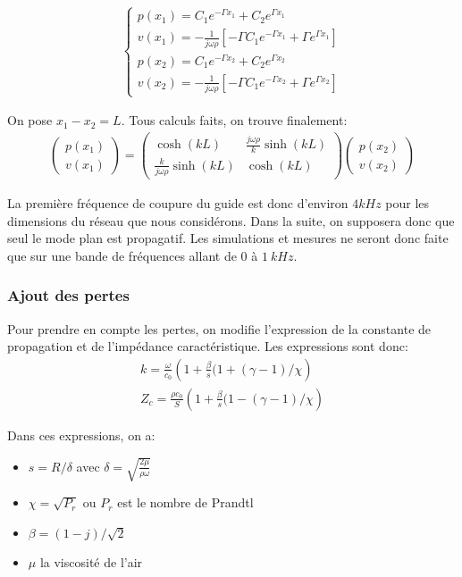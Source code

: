 \begin{eqnarray*}
\begin{cases}
p(x_1)  =  C_1 e^{-\Gamma x_1} + C_2 e^{\Gamma x_1} \\
v(x_1)  =  -\frac{1}{j\omega\rho} [ -\Gamma C_1 e^{-\Gamma x_1} + \Gamma e^{\Gamma x_1}]\\
p(x_2)  =  C_1 e^{-\Gamma x_2} + C_2 e^{\Gamma x_2} \\
v(x_2)  =  -\frac{1}{j\omega\rho} [ -\Gamma C_1 e^{-\Gamma x_2} + \Gamma e^{\Gamma x_2}]
\end{cases}
\end{eqnarray*}
 
On pose $x_1 - x_2 = L$. Tous calculs faits, on trouve finalement:
\begin{eqnarray*}
\begin{pmatrix} p(x_1) \\ v(x_1) \end{pmatrix} = \begin{pmatrix} \cosh(kL) & \frac{j\omega\rho}{k} \sinh(k L) \\  \frac{k}{j\omega\rho}\sinh(k L) & \cosh(k L) \end{pmatrix} \begin{pmatrix} p(x_2) \\ v(x_2) \end{pmatrix}
\end{eqnarray*}

La première fréquence de coupure du guide est donc d'environ $4kHz$ pour les dimensions du réseau que nous considérons. Dans la suite, on supposera donc que seul le mode plan est propagatif. Les simulations et mesures ne seront donc faite que sur une bande de fréquences allant de $0$ à $1~kHz$.

\subsubsection{Ajout des pertes}

Pour prendre en compte les pertes, on modifie l'expression de la constante de propagation et de l'impédance caractéristique. Les expressions sont donc:
\begin{eqnarray*}
 k =  \frac{\omega}{c_0} \left( 1 + \frac{\beta}{s}(1+(\gamma-1)/ \chi \right) \\
 Z_c =  \frac{\rho c_0}{S} \left( 1 + \frac{\beta}{s}(1-(\gamma-1)/ \chi \right) 
\end{eqnarray*}

Dans ces expressions, on a:
\begin{itemize}
 \item  $s=R/ \delta$ avec $\delta = \sqrt{\frac{2 \mu}{\rho \omega}}$
 \item  $\chi = \sqrt{P_r}$ ou $P_r$ est le nombre de Prandtl
 \item $\beta = (1-j)/\sqrt{2}$ 
 \item $\mu$ la viscosité de l'air
\end{itemize}

